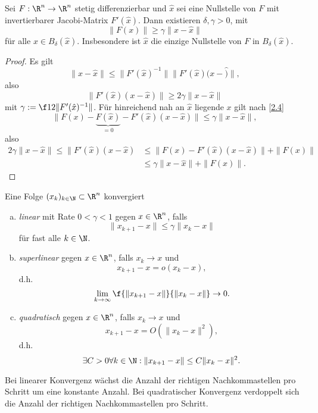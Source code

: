 \begin{lem} \label{2.43}
	Sei $F: \R^n \to \R^n$ stetig differenzierbar und $\hat x$ sei eine Nullstelle von $F$ mit invertierbarer Jacobi-Matrix $F'(\hat x)$.
	Dann existieren $\delta, \gamma > 0$, mit
	\[
		\|F(x)\|
		\ge \gamma \|x-\hat x\|
	\]
	für alle $x \in B_\delta(\hat x)$.
	Insbesondere ist $\hat x$ die einzige Nullstelle von $F$ in $B_\delta(\hat x)$.
	\begin{proof}
		Es gilt
		\[
			\|x-\hat x\| \le \|F'(\hat x)^{-1}\| \|F'(\hat x)(x-\hat)\|,
		\]
		also
		\[
			\|F'(\hat x)(x-\hat x)\|
			\ge 2\gamma \|x - \hat x\|
		\]
		mit $\gamma := \f 1{2\|F'(\hat x)^{-1}\|}$.
		Für hinreichend nah an $\hat x$ liegende $x$ gilt nach \ref{2.4}
		\[
			\|F(x) - \underbrace{F(\hat x)}_{=0} - F'(\hat x)(x-\hat x) \|
			\le \gamma \|x-\hat x\|,
		\]
		also
		\begin{align*}
			2\gamma \|x-\hat x\|
			\le \|F'(\hat x)(x-\hat x)
			&\le \|F(x) - F'(\hat x)(x-\hat x) \| + \|F(x)\| \\
			&\le \gamma \|x-\hat x\| + \| F(x) \|.
		\end{align*}
	\end{proof}
\end{lem}

\begin{df} \label{2.44}
	Eine Folge $(x_k)_{k\in\N} \subset \R^n$ konvergiert
	\begin{enumerate}[(a)]
		\item
			\emph{linear} mit Rate $0 < \gamma < 1$ gegen $x \in \R^n$, falls
			\[
				\|x_{k+1} - x\| \le \gamma \|x_k - x\|
			\]
			für fast alle $k \in \N$.
		\item
			\emph{superlinear} gegen $x \in \R^n$, falls $x_k \to x$ und
			\[
				x_{k+1} - x
				= o(x_k - x),
			\]
			d.h.
			\[
				\lim_{k\to\infty} \f {\|x_{k+1}-x\|}{\|x_k - x\|} \to 0.
			\]
		\item
			\emph{quadratisch} gegen $x\in \R^n$, falls $x_k \to x$ und
			\[
				x_{k+1} - x
				= O(\|x_k - x\|^2),
			\]
			d.h.
			\[
				\exists C > 0 \forall k\in \N : \|x_{k+1} - x \| \le C \|x_k - x\|^2.
			\]
	\end{enumerate}
\end{df}

\begin{nt} \label{2.45}
	Bei linearer Konvergenz wächst die Anzahl der richtigen Nachkommastellen pro Schritt um eine konstante Anzahl.
	Bei quadratischer Konvergenz verdoppelt sich die Anzahl der richtigen Nachkommastellen pro Schritt.
\end{nt}

